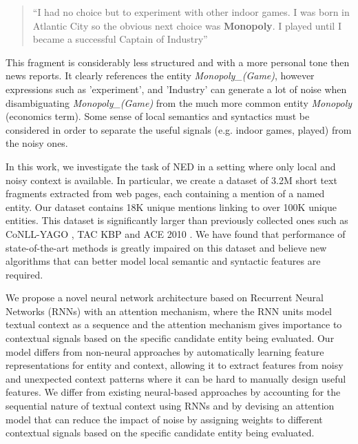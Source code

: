 \documentclass[11pt]{article}
\begin{document}
\begin{quote}
	``I had no choice but to experiment with other indoor games. I was born in Atlantic City so the obvious next choice was \textbf{Monopoly}. I played until I became a successful Captain of Industry''
\end{quote}

This fragment is considerably less structured and with a more personal tone then news reports. It clearly references the entity \textit{Monopoly\_(Game)}, however expressions such as 'experiment', and 'Industry' can generate a lot of noise when disambiguating \textit{Monopoly\_(Game)} from the much more common entity \textit{Monopoly} (economics term). Some sense of local semantics and syntactics must be considered in order to separate the useful signals (e.g. indoor games, played) from the noisy ones.

In this work, we investigate the task of NED in a setting where only local and noisy context is available. In particular, we create a dataset of 3.2M short text fragments extracted from web pages, each containing a mention of a named entity. Our dataset contains 18K unique mentions linking to over 100K unique entities. This dataset is significantly larger than previously collected ones such as CoNLL-YAGO \cite{hoffart2011robust}, TAC KBP \cite{ji2010overview} and ACE 2010 \cite{bentivogli2010extending}. We have found that performance of state-of-the-art methods is greatly impaired on this dataset and believe new algorithms that can better model local semantic and syntactic features are required.


We propose a novel neural network architecture based on Recurrent Neural Networks (RNNs) with an attention mechanism, where the RNN units model textual context as a sequence and the attention mechanism gives importance to contextual signals based on the specific candidate entity being evaluated. Our model differs from non-neural approaches by automatically learning feature representations for entity and context, allowing it to extract features from noisy and unexpected context patterns where it can be hard to manually design useful features. We differ from existing neural-based approaches by accounting for the sequential nature of textual context using RNNs and by devising an attention model that can reduce the impact of noise by assigning weights to different contextual signals based on the specific candidate entity being evaluated.
\end{document}
